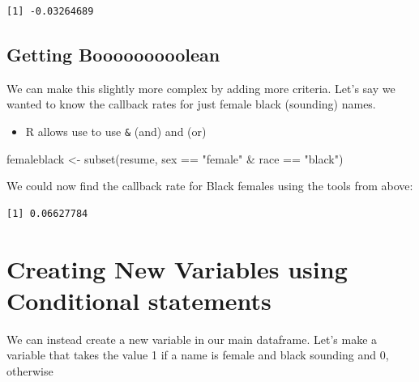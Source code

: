 \documentclass[
  letterpaper,
  DIV=11,
  numbers=noendperiod]{scrreprt}
\newenvironment{Shaded}{\begin{snugshade}}{\end{snugshade}}
\newcommand{\FunctionTok}[1]{\textcolor[rgb]{0.28,0.35,0.67}{#1}}
\newcommand{\NormalTok}[1]{\textcolor[rgb]{0.00,0.23,0.31}{#1}}
\newcommand{\OtherTok}[1]{\textcolor[rgb]{0.00,0.23,0.31}{#1}}
\newcommand{\SpecialCharTok}[1]{\textcolor[rgb]{0.37,0.37,0.37}{#1}}
\newcommand{\StringTok}[1]{\textcolor[rgb]{0.13,0.47,0.30}{#1}}
\providecommand{\tightlist}{%
  \setlength{\itemsep}{0pt}\setlength{\parskip}{0pt}}\usepackage{longtable,booktabs,array}
\begin{document}
\begin{verbatim}
[1] -0.03264689
\end{verbatim}

\hypertarget{getting-booooooooolean}{%
\subsection{Getting Booooooooolean}\label{getting-booooooooolean}}

We can make this slightly more complex by adding more criteria. Let's
say we wanted to know the callback rates for just female black
(sounding) names.

\begin{itemize}
\tightlist
\item
  R allows use to use \texttt{\&} (and) and \texttt{\textbar{}} (or)
\end{itemize}

\begin{Shaded}
\begin{Highlighting}[]
\NormalTok{femaleblack }\OtherTok{\textless{}{-}} \FunctionTok{subset}\NormalTok{(resume, sex }\SpecialCharTok{==} \StringTok{"female"} \SpecialCharTok{\&}\NormalTok{ race }\SpecialCharTok{==} \StringTok{"black"}\NormalTok{)}
\end{Highlighting}
\end{Shaded}

We could now find the callback rate for Black females using the tools
from above:

\begin{Shaded}
\end{Shaded}

\begin{verbatim}
[1] 0.06627784
\end{verbatim}

\hypertarget{creating-new-variables-using-conditional-statements}{%
\section{Creating New Variables using Conditional
statements}\label{creating-new-variables-using-conditional-statements}}

We can instead create a new variable in our main dataframe. Let's make a
variable that takes the value 1 if a name is female and black sounding
and 0, otherwise
\end{document}
